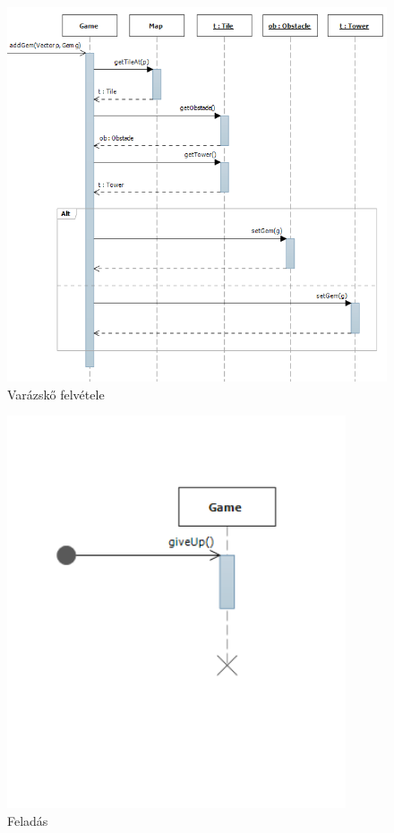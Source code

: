\begin{figure}[H]
\begin{center}
\includegraphics[width=17cm]{images/adding_gem.png}
\caption{Varázskő felvétele}
\label{fig:adding_gem}
\end{center}
\end{figure}

\begin{figure}[H]
\begin{center}
\includegraphics[width=10cm]{images/giving_up.png}
\caption{Feladás}
\label{fig:giving_up}
\end{center}
\end{figure}


